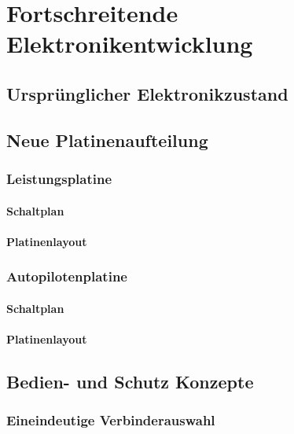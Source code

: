 \chapter{Fortschreitende Elektronikentwicklung}\label{cha:Elektronikentwicklung}

\section{Ursprünglicher Elektronikzustand}

\section{Neue Platinenaufteilung}

\subsection{Leistungsplatine}

\subsubsection{Schaltplan}

\subsubsection{Platinenlayout}

\subsection{Autopilotenplatine}

\subsubsection{Schaltplan}

\subsubsection{Platinenlayout}

\section{Bedien- und Schutz Konzepte}

\subsection{Eineindeutige Verbinderauswahl}

